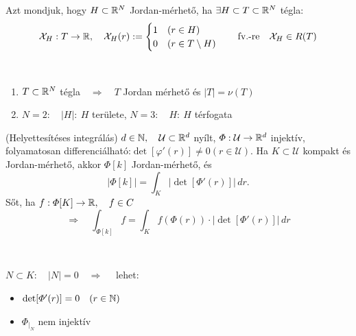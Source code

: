 \documentclass[a4paper,11.5pt]{article}
\begin{document}
	\begin{definition}
		Azt mondjuk, hogy $H\subset\mathbb{R}^N$ Jordan-mérhető, ha $\exists H\subset T\subset\mathbb{R}^N$ tégla:
		\[ \mathcal{X}_H:T\to\mathbb{R},\quad \mathcal{X}_H(r):=\begin{cases}
			1\quad (r\in H)\\
			0\quad (r\in T\setminus H)
		\end{cases}\quad \text{fv.-re}\quad \mathcal{X}_H\in R(T) \]
	\end{definition}
	\begin{note}\ 
		
		\begin{enumerate}
			\item $T\subset\mathbb{R}^N$ tégla\quad$\quad \Rightarrow\quad T$ Jordan mérhető és $|T|=\nu(T)$
			\item $N=2:\quad |H|:\ H$ területe, $N=3:\quad H:\ H$ térfogata 
		\end{enumerate}
	\end{note}
	\begin{theorem}
		(Helyettesítéses integrálás)  $d\in\mathbb{N},\quad \mathcal{U}\subset\mathbb{R}^d$ nyílt, $\varPhi:\mathcal{U}\to\mathbb{R}^d$ injektív, folyamatosan differenciálható:\quad $\det[\varphi'(r)]\not=0(r\in\mathcal{U})$. Ha $K\subset\mathcal{U}$ kompakt és Jordan-mérhető, akkor $\varPhi[k]$ Jordan-mérhető, és
		\[ |\varPhi[k]|=\int_K|\det[\varPhi'(r)]|\,dr. \]
		 Sőt, ha $f:\varPhi[K]\to\mathbb{R},\quad f\in C$
		 \[ \Rightarrow\quad \int_{\varPhi[k]}f=\int_Kf(\varPhi(r))\cdot\big|\det[\varPhi'(r)]\big|\,dr \]
	\end{theorem}
	\begin{note}\
		
		$N\subset K:\quad |N|=0\quad \Rightarrow\quad$ lehet:
		\begin{itemize}[$\bullet$]
			\item $\det[\varPhi'(r)]=0\quad (r\in\mathbb{N})$
			\item $\varPhi_{\big|_N}$ nem injektív
		\end{itemize}
	\end{note}
\end{document}
